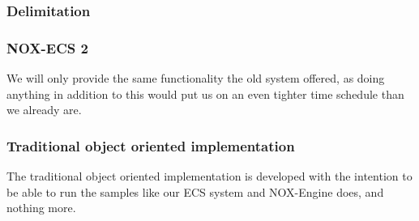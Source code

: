 \subsubsection{Delimitation}
\subsubsection*{NOX-ECS 2}
We will only provide the same functionality the old system offered, as doing anything in addition to this would put us on an even tighter time schedule than we already are.

\subsubsection*{Traditional object oriented implementation}
The traditional object oriented implementation is developed with the intention to be able to run the samples like our ECS system and NOX-Engine does, and nothing more.